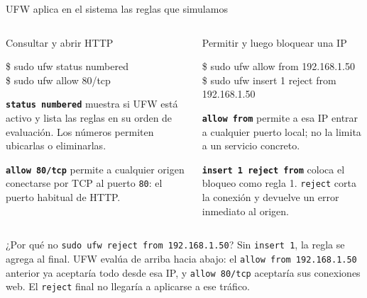 \documentclass[aspectratio=169,10pt,c]{beamer}
\begin{document}
\begin{frame}[t]{UFW aplica en el sistema las reglas que simulamos}
\begin{columns}[T,onlytextwidth]
\begin{exampleblock}{Consultar y abrir HTTP}
\begin{terminal}\scriptsize
\$ sudo ufw status numbered\\
\$ sudo ufw allow 80/tcp
\end{terminal}
\footnotesize
\textbf{\texttt{status numbered}} muestra si UFW está activo y lista las reglas en su orden de evaluación. Los números permiten ubicarlas o eliminarlas.\par
\vspace{1mm}
\textbf{\texttt{allow 80/tcp}} permite a cualquier origen conectarse por TCP al puerto \texttt{80}: el puerto habitual de HTTP.
\end{exampleblock}
\begin{exampleblock}{Permitir y luego bloquear una IP}
\begin{terminal}\scriptsize
\$ sudo ufw allow from 192.168.1.50\\
\$ sudo ufw insert 1 reject from 192.168.1.50
\end{terminal}
\footnotesize
\textbf{\texttt{allow from}} permite a esa IP entrar a cualquier puerto local; no la limita a un servicio concreto.\par
\vspace{1mm}
\textbf{\texttt{insert 1 reject from}} coloca el bloqueo como regla 1. \texttt{reject} corta la conexión y devuelve un error inmediato al origen.
\end{exampleblock}
\end{columns}
\begin{alertblock}{¿Por qué no \texttt{sudo ufw reject from 192.168.1.50}?}
\footnotesize Sin \texttt{insert 1}, la regla se agrega al final. UFW evalúa de arriba hacia abajo: el \texttt{allow from 192.168.1.50} anterior ya aceptaría todo desde esa IP, y \texttt{allow 80/tcp} aceptaría sus conexiones web. El \texttt{reject} final no llegaría a aplicarse a ese tráfico.
\end{alertblock}
\end{frame}
\end{document}
